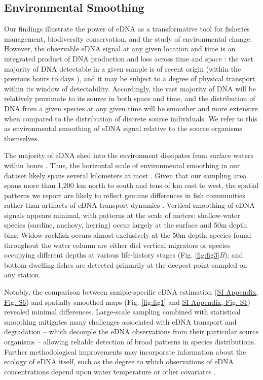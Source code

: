 \documentclass{article}
\begin{document}
\subsection*{Environmental Smoothing}
Our findings illustrate the power of eDNA as a transformative tool for fisheries management, biodiversity conservation, and the study of environmental change. However, the observable eDNA signal at any given location and time is an integrated product of DNA production and loss across time and space \cite{gold2023}: the vast majority of DNA detectable in a given sample is of recent origin (within the previous hours to days \cite{strickler2015,collins2018,machler2018}), and it may be subject to a degree of physical transport within its window of detectability. Accordingly, the vast majority of DNA will be relatively proximate to its source in both space and time, and the distribution of DNA from a given species at any given time will be smoother and more extensive when compared to the distribution of discrete source individuals. We refer to this as environmental smoothing of eDNA signal relative to the source organisms themselves. 

The majority of eDNA shed into the environment dissipates from surface waters within hours \cite{andruszkiewiczallan2021}. Thus, the horizontal scale of environmental smoothing in our dataset likely spans several kilometers at most \cite{baetscher2023}. Given that our sampling area spans more than 1,200 km north to south and tens of km east to west, the spatial patterns we report are likely to reflect genuine differences in fish communities rather than artifacts of eDNA transport dynamics \cite{guri2023}. Vertical smoothing of eDNA signals appears minimal, with patterns at the scale of meters: shallow-water species (sardine, anchovy, herring) occur largely at the surface and 50m depth bins; Widow rockfish occurs almost exclusively at the 50m depth; species found throughout the water column are either diel vertical migrators or species occupying different depths at various life-history stages (Fig. \ref{fig:fig3}\textit{B}); and bottom-dwelling fishes are detected primarily at the deepest point sampled on any station. 

Notably, the comparison between sample-specific eDNA estimation (\href{SI_Appendix.pdf}{SI Appendix, Fig. S6}) and spatially smoothed maps (Fig. \ref{fig:fig1} and \href{SI_Appendix.pdf}{SI Appendix, Fig. S1}) revealed minimal differences. Large-scale sampling combined with statistical smoothing mitigates many challenges associated with eDNA transport and degradation -- which decouple the eDNA observations from their particular source organisms -- allowing reliable detection of broad patterns in species distributions. Further methodological improvements may incorporate information about the ecology of eDNA itself, such as the degree to which observations of eDNA concentrations depend upon water temperature or other covariates \cite{jo2019b}. 
\end{document}
